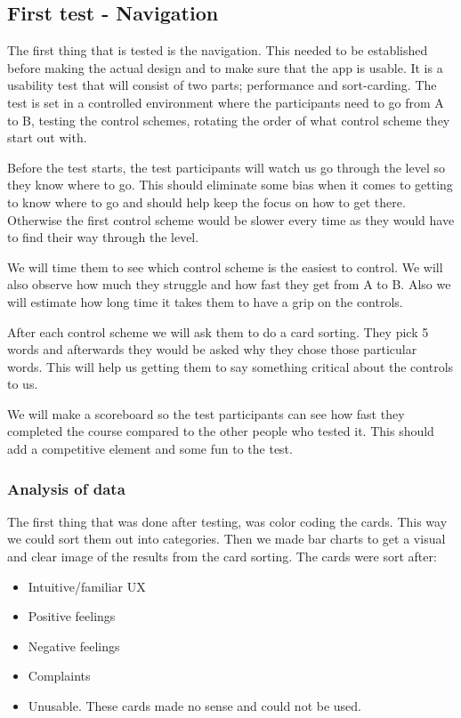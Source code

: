 \subsection{First test - Navigation}

The first thing that is tested is the navigation. This needed to be established before making the actual design and to make sure that the app is usable.
It is a usability test that will consist of two parts; performance and sort-carding. 
The test is set in a controlled environment where the participants need to go from A to B, testing the control schemes, rotating the order of what control scheme they start out with.

Before the test starts, the test participants will watch us go through the level so they know where to go. This should eliminate some bias when it comes to getting to know where to go and should help keep the focus on how to get there. Otherwise the first control scheme would be slower every time as they would have to find their way through the level.

We will time them to see which control scheme is the easiest to control. We will also observe how much they struggle and how fast they get from A to B. Also we will estimate how long time it takes them to have a grip on the controls.

After each control scheme we will ask them to do a card sorting. They pick 5 words and afterwards they would be asked why they chose those particular words. This will help us getting them to say something critical about the controls to us. 

We will make a scoreboard so the test participants can see how fast they completed the course compared to the other people who tested it.
This should add a competitive element and some fun to the test.

\subsubsection{Analysis of data}

The first thing that was done after testing, was color coding the cards. This way we could sort them out into categories. 
Then we made bar charts to get a visual and clear image of the results from the card sorting.
The cards were sort after:

\begin{itemize}
\item Intuitive/familiar UX
\item Positive feelings
\item Negative feelings
\item Complaints
\item Unusable. These cards made no sense and could not be used.
\end{itemize}

